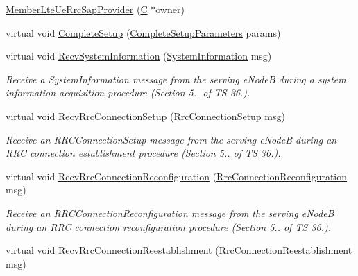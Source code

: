 \begin{DoxyCompactItemize}
\item 
\hyperlink{classns3_1_1MemberLteUeRrcSapProvider_afe2fba69c79a14161663b43ae9ad3c54}{Member\+Lte\+Ue\+Rrc\+Sap\+Provider} (\hyperlink{loss__COST231__small__cities__urban_8m_aaa53ca0b650dfd85c4f59fa156f7a2cc}{C} $\ast$owner)
\item 
virtual void \hyperlink{classns3_1_1MemberLteUeRrcSapProvider_a297ed98c646e9d869857358919557d40}{Complete\+Setup} (\hyperlink{structns3_1_1LteUeRrcSapProvider_1_1CompleteSetupParameters}{Complete\+Setup\+Parameters} params)
\item 
virtual void \hyperlink{classns3_1_1MemberLteUeRrcSapProvider_a1032a8166d6d1e807b7669663884c6c6}{Recv\+System\+Information} (\hyperlink{structns3_1_1LteRrcSap_1_1SystemInformation}{System\+Information} msg)
\begin{DoxyCompactList}\small\item\em Receive a {\itshape System\+Information} message from the serving e\+NodeB during a system information acquisition procedure (Section 5.. of TS 36.). \end{DoxyCompactList}\item 
virtual void \hyperlink{classns3_1_1MemberLteUeRrcSapProvider_adc142e8efb820d8cbf3f2225e9be7bee}{Recv\+Rrc\+Connection\+Setup} (\hyperlink{structns3_1_1LteRrcSap_1_1RrcConnectionSetup}{Rrc\+Connection\+Setup} msg)
\begin{DoxyCompactList}\small\item\em Receive an {\itshape R\+R\+C\+Connection\+Setup} message from the serving e\+NodeB during an R\+RC connection establishment procedure (Section 5.. of TS 36.). \end{DoxyCompactList}\item 
virtual void \hyperlink{classns3_1_1MemberLteUeRrcSapProvider_a784de865bb59c25c0422fda0514d6aa7}{Recv\+Rrc\+Connection\+Reconfiguration} (\hyperlink{structns3_1_1LteRrcSap_1_1RrcConnectionReconfiguration}{Rrc\+Connection\+Reconfiguration} msg)
\begin{DoxyCompactList}\small\item\em Receive an {\itshape R\+R\+C\+Connection\+Reconfiguration} message from the serving e\+NodeB during an R\+RC connection reconfiguration procedure (Section 5.. of TS 36.). \end{DoxyCompactList}\item 
virtual void \hyperlink{classns3_1_1MemberLteUeRrcSapProvider_a71ecf13eb97fc1a8f12d7e253de36bc4}{Recv\+Rrc\+Connection\+Reestablishment} (\hyperlink{structns3_1_1LteRrcSap_1_1RrcConnectionReestablishment}{Rrc\+Connection\+Reestablishment} msg)

\end{DoxyCompactItemize}
